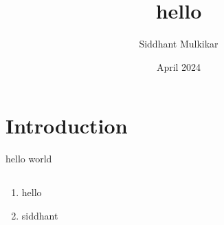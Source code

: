 \documentclass{article}
\title{hello}
\author{Siddhant Mulkikar}
\date{April 2024}
\begin{document}
\maketitle

\section{Introduction}
hello world
\subsection{}
\begin{enumerate}
    \item hello
    \item siddhant 
\end{enumerate}
\end{document}
